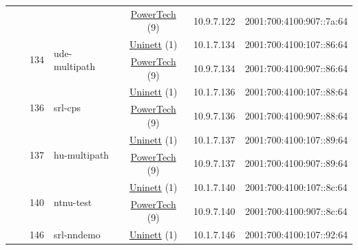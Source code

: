 \begin{small}
\begin{center}
\begin{longtable}{|c|c|c|c|c|c|c|c|}
  &  &  &  & \multicolumn{2}{|c|}{\tiny{\href{http://www.powertech.no}{PowerTech} (9)}} & \tiny{10.9.7.122} & \tiny{2001:700:4100:907::7a:64} \\* \cline{3-3}\cline{4-4}\cline{5-5}\cline{6-6}\cline{7-7}\cline{8-8}
  &  & \multirow{2}{*}{\tiny{134}} & \multicolumn{1}{|l|}{\multirow{2}{*}{\tiny{ude-multipath}}} & \multicolumn{2}{|c|}{\tiny{\href{https://www.uninett.no}{Uninett} (1)}} & \tiny{10.1.7.134} & \tiny{2001:700:4100:107::86:64} \\* \cline{5-5}\cline{6-6}\cline{7-7}\cline{8-8}
  &  &  &  & \multicolumn{2}{|c|}{\tiny{\href{http://www.powertech.no}{PowerTech} (9)}} & \tiny{10.9.7.134} & \tiny{2001:700:4100:907::86:64} \\* \cline{3-3}\cline{4-4}\cline{5-5}\cline{6-6}\cline{7-7}\cline{8-8}
  &  & \multirow{2}{*}{\tiny{136}} & \multicolumn{1}{|l|}{\multirow{2}{*}{\tiny{srl-cps}}} & \multicolumn{2}{|c|}{\tiny{\href{https://www.uninett.no}{Uninett} (1)}} & \tiny{10.1.7.136} & \tiny{2001:700:4100:107::88:64} \\* \cline{5-5}\cline{6-6}\cline{7-7}\cline{8-8}
  &  &  &  & \multicolumn{2}{|c|}{\tiny{\href{http://www.powertech.no}{PowerTech} (9)}} & \tiny{10.9.7.136} & \tiny{2001:700:4100:907::88:64} \\* \cline{3-3}\cline{4-4}\cline{5-5}\cline{6-6}\cline{7-7}\cline{8-8}
  &  & \multirow{2}{*}{\tiny{137}} & \multicolumn{1}{|l|}{\multirow{2}{*}{\tiny{hu-multipath}}} & \multicolumn{2}{|c|}{\tiny{\href{https://www.uninett.no}{Uninett} (1)}} & \tiny{10.1.7.137} & \tiny{2001:700:4100:107::89:64} \\* \cline{5-5}\cline{6-6}\cline{7-7}\cline{8-8}
  &  &  &  & \multicolumn{2}{|c|}{\tiny{\href{http://www.powertech.no}{PowerTech} (9)}} & \tiny{10.9.7.137} & \tiny{2001:700:4100:907::89:64} \\* \cline{3-3}\cline{4-4}\cline{5-5}\cline{6-6}\cline{7-7}\cline{8-8}
  &  & \multirow{2}{*}{\tiny{140}} & \multicolumn{1}{|l|}{\multirow{2}{*}{\tiny{ntnu-test}}} & \multicolumn{2}{|c|}{\tiny{\href{https://www.uninett.no}{Uninett} (1)}} & \tiny{10.1.7.140} & \tiny{2001:700:4100:107::8c:64} \\* \cline{5-5}\cline{6-6}\cline{7-7}\cline{8-8}
  &  &  &  & \multicolumn{2}{|c|}{\tiny{\href{http://www.powertech.no}{PowerTech} (9)}} & \tiny{10.9.7.140} & \tiny{2001:700:4100:907::8c:64} \\* \cline{3-3}\cline{4-4}\cline{5-5}\cline{6-6}\cline{7-7}\cline{8-8}
  &  & \multirow{2}{*}{\tiny{146}} & \multicolumn{1}{|l|}{\multirow{2}{*}{\tiny{srl-nndemo}}} & \multicolumn{2}{|c|}{\tiny{\href{https://www.uninett.no}{Uninett} (1)}} & \tiny{10.1.7.146} & \tiny{2001:700:4100:107::92:64} \\* \cline{5-5}\cline{6-6}\cline{7-7}\cline{8-8}

\end{longtable}
\end{center}
\end{small}
